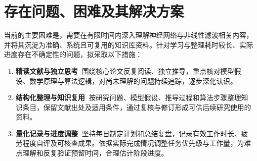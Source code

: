 \section{存在问题、困难及其解决方案}

当前的主要困难是，需要在有限时间内深入理解神经网络与非线性滤波相关内容，并将其沉淀为准确、系统且可复用的知识库资料。针对学习与整理耗时较长、实际进度存在不确定性的问题，拟采取以下措施：

\begin{enumerate}[label=(\arabic*),leftmargin=2.5em,topsep=3pt,itemsep=6pt,parsep=0pt]
  \item \textbf{精读文献与独立思考\ }围绕核心论文反复阅读、独立推导，重点核对模型假设、数学原理与算法逻辑，对尚未理解的问题持续追踪，逐步深化认识。
  \item \textbf{结构化整理与知识复用\ }按研究问题、模型假设、推导过程和算法步骤整理知识条目，保留文献出处及适用条件，通过复核与修订形成可供后续研究使用的资料。
  \item \textbf{量化记录与进度调整\ }坚持每日制定计划和总结复盘，记录有效工作时长、疲劳程度自评及可核查成果。依据实际完成情况调整任务优先级与工作量，为难点理解和反复验证预留时间，合理估计阶段进度。
\end{enumerate}
